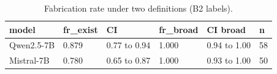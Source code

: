 \begin{table}[t]
\centering
\small
\setlength{\tabcolsep}{3pt}
\caption{Fabrication rate under two definitions (B2 labels).}
\label{tab:fr}
\begin{tabular}{llllll}
\toprule
model & fr\_exist & CI & fr\_broad & CI broad & n \\
\midrule
Qwen2.5-7B & 0.879 & 0.77 to 0.94 & 1.000 & 0.94 to 1.00 & 58 \\
Mistral-7B & 0.780 & 0.65 to 0.87 & 1.000 & 0.93 to 1.00 & 50 \\
\bottomrule
\end{tabular}
\end{table}
